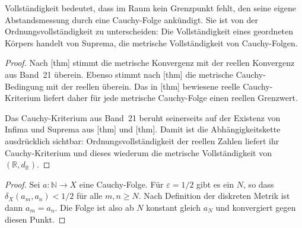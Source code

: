 \documentclass[main.tex]{subfiles}
\begin{document}

Vollständigkeit bedeutet, dass im Raum kein Grenzpunkt fehlt, den seine
eigene Abstandsmessung durch eine Cauchy-Folge ankündigt. Sie ist von der
Ordnungsvollständigkeit zu unterscheiden: Die Vollständigkeit eines
geordneten Körpers handelt von Suprema, die metrische Vollständigkeit von
Cauchy-Folgen.

\begin{proof}
Nach [thm] stimmt die
metrische Konvergenz mit der reellen Konvergenz aus Band~21 überein. Ebenso
stimmt nach
[thm] die metrische
Cauchy-Bedingung mit der reellen überein. Das in
[thm] bewiesene reelle
Cauchy-Kriterium liefert daher für jede metrische Cauchy-Folge einen reellen
Grenzwert.

Das Cauchy-Kriterium aus Band~21 beruht seinerseits auf der Existenz von
Infima und Suprema aus
[thm] und
[thm]. Damit ist die
Abhängigkeitskette ausdrücklich sichtbar:
Ordnungsvollständigkeit der reellen Zahlen liefert ihr Cauchy-Kriterium und
dieses wiederum die metrische Vollständigkeit von
\((\mathbb R,d_{\mathbb R})\).
\end{proof}

\begin{proof}
Sei \(a\colon\mathbb N\to X\) eine Cauchy-Folge. Für
\(\varepsilon=1/2\) gibt es ein \(N\), so dass
\(\delta_X(a_m,a_n)<1/2\) für alle \(m,n\geq N\). Nach Definition der
diskreten Metrik ist dann \(a_m=a_n\). Die Folge ist also ab \(N\) konstant
gleich \(a_N\) und konvergiert gegen diesen Punkt.
\end{proof}
\end{document}
